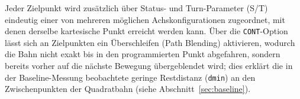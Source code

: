 Jeder Zielpunkt wird zusätzlich über Status- und Turn-Parameter (S/T)
eindeutig einer von mehreren möglichen Achskonfigurationen zugeordnet, mit
denen derselbe kartesische Punkt erreicht werden kann. Über die
\texttt{CONT}-Option lässt sich an Zielpunkten ein Überschleifen (Path
Blending) aktivieren, wodurch die Bahn nicht exakt bis in den programmierten
Punkt abgefahren, sondern bereits vorher auf die nächste Bewegung
übergeblendet wird; dies erklärt die in der Baseline-Messung beobachtete
geringe Restdistanz (\texttt{dmin}) an den Zwischenpunkten der Quadratbahn
(siehe Abschnitt~\ref{sec:baseline}).

